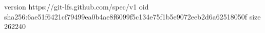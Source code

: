 version https://git-lfs.github.com/spec/v1
oid sha256:6ae51f6421cf79499ea0b4ae8f6099f5c134e75f1b5e9072eeb2d6a62518050f
size 262240
